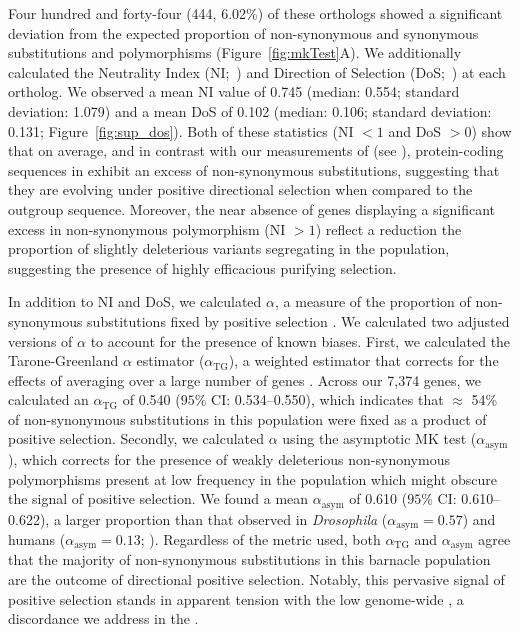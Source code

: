 Four hundred and forty-four (444, 6.02\%) of these orthologs showed a significant
deviation from the expected proportion of non-synonymous and synonymous substitutions
and polymorphisms (Figure~\ref{fig:mkTest}A).
We additionally calculated the Neutrality Index (NI;~\citealp{rand_excess_1996}) and
Direction of Selection (DoS;~\citealp{stoletzki_estimation_2011}) at each ortholog.
We observed a mean NI value of 0.745 (median: 0.554; standard deviation: 1.079) and
a mean DoS of 0.102 (median: 0.106; standard deviation: 0.131; Figure~\ref{fig:sup_dos}).
Both of these statistics (NI $<1$ and DoS $>0$) show that on average, and in contrast
with our measurements of \dnds{} (see ), protein-coding
sequences in \bgla{} exhibit an excess of non-synonymous substitutions, suggesting that
they are evolving under positive directional selection when compared to the outgroup sequence.
Moreover, the near absence of genes displaying a significant excess in non-synonymous
polymorphism (NI $>1$) reflect a reduction the proportion of slightly deleterious
variants segregating in the population, suggesting the presence of highly efficacious
purifying selection.
\vspace{0.1cm}

In addition to NI and DoS, we calculated $\alpha$, a measure of the proportion
of non-synonymous substitutions fixed by positive selection \citep{smith_adaptive_2002}.
We calculated two adjusted versions of $\alpha$ to account for the presence of known
biases.
First, we calculated the Tarone-Greenland $\alpha$ estimator ($\alpha_\text{TG}$), a
weighted estimator that corrects for the effects of averaging over a large number of
genes \citep{stoletzki_estimation_2011}.
Across our 7{,}374 genes, we calculated an $\alpha_\text{TG}$ of 0.540 ($95\%$ CI:
0.534--0.550), which indicates that $\approx$ 54\% of non-synonymous substitutions in
this \bgla{} population were fixed as a product of positive selection.
Secondly, we calculated $\alpha$ using the asymptotic MK test ($\alpha_\text{asym}$),
which corrects for the presence of weakly deleterious non-synonymous polymorphisms
present at low frequency in the population \citep{messer_frequent_2013} which might
obscure the signal of positive selection.
We found a mean $\alpha_\text{asym}$ of 0.610 ($95\%$ CI: 0.610--0.622), a
larger proportion than that observed in \textit{Drosophila} ($\alpha_\text{asym} = 0.57$)
and humans ($\alpha_\text{asym} = 0.13$; \citealp{haller_asymptoticmk_2017,messer_frequent_2013}).
Regardless of the metric used, both $\alpha_\text{TG}$ and $\alpha_\text{asym}$ agree
that the majority of non-synonymous substitutions in this barnacle population are the
outcome of directional positive selection.
Notably, this pervasive signal of positive selection stands in apparent tension with
the low genome-wide \dnds{}, a discordance we address in the .
\vspace{0.1cm}


